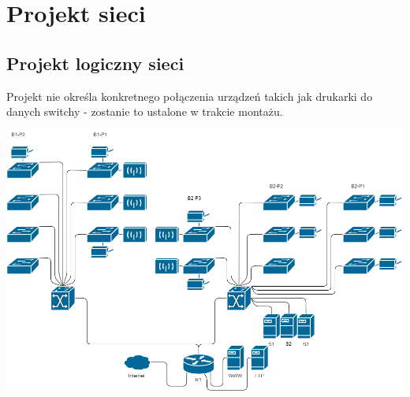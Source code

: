 \documentclass{article}
\begin{document}
\newpage
\section{Projekt sieci}

\subsection{Projekt logiczny sieci}
\par Projekt nie określa konkretnego połączenia urządzeń takich jak drukarki do danych switchy - zostanie to ustalone w trakcie montażu.
\begin{center}
	\includegraphics[scale=0.55, center]{ts2_diagram_b}
\end{center}
\newpage
\end{document}

